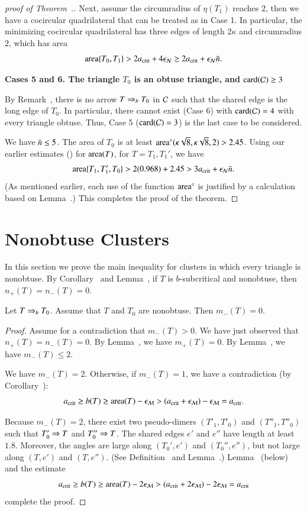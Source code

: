 \begin{proof}[proof of Theorem~.]
Next, assume the circumradius of $\eta(T_1)$ reaches $2$, then we
have a cocircular quadrilateral that can be treated as in Case 1.  In
particular, the minimizing cocircular quadrilateral has three edges of
length $2\kappa$ and circumradius $2$, which has area
\[
{\operatorname{area}}\{T_0,T_1\}
>  2a_\text{crit}+4\epsilon_{\mathcal N} \ge 2a_\text{crit}+\epsilon_{\mathcal N}\bar n.
\]

{\bf Cases 5 and 6. The triangle $T_0$ is an obtuse triangle, and
  ${\operatorname{card}}(\mathcal C)\ge3$} %

By Remark~, there is no arrow $T \Rightarrow_{b} T_0$ in $\mathcal C$
such that the shared edge is the long edge of $T_0$.  In particular,
there cannot exist (Case 6) with ${\operatorname{card}}(\mathcal C)=4$ with %
every triangle obtuse.  Thus, Case 5 (${\operatorname{card}}(\mathcal C)=3$) is the last case to be
considered.

We have $\bar n\le 5$.
The area of $T_0$ is at least
${\operatorname{area}}^\circ(\kappa\sqrt{8},\kappa\sqrt{8},2) > 2.45$.  
Using our earlier estimates ()
for ${\operatorname{area}}(T)$, for $T=T_1,T_1'$, we
have
\[
{\operatorname{area}}\{T_1,T_1',T_0\} > 2 (0.968) + 2.45 > 3a_\text{crit} + \epsilon_{\mathcal N}\bar n.
\] 
(As mentioned earlier, each use of the function ${\operatorname{area}}^\circ$ is justified
by a calculation based on Lemma~.)
This completes the proof of the theorem.
\end{proof}

\section{Nonobtuse Clusters}

In this section we prove the main inequality for clusters in which
every triangle is nonobtuse.  By Corollary~ and
Lemma~, if $T$ is $b$-subcritical and nonobtuse, then
$n_+(T)=n_-(T)=0$.

\begin{lemma} 
  Let $T\Rightarrow_{b} T_0$. Assume that $T$ and $T_0$ are nonobtuse.  Then
  $m_-(T)=0$.
\end{lemma}

\begin{proof}  
  Assume for a contradiction that $m_-(T)>0$.  We have just observed
  that $n_+(T)=n_-(T)=0$.  By Lemma~, we have
  $m_+(T)=0$.  By Lemma~, we have $m_-(T)\le 2$.

  We have $m_-(T)=2$.  Otherwise, if $m_-(T)=1$, we have a
  contradiction (by Corollary~):
\[
a_\text{crit} \ge b(T) \ge {\operatorname{area}}(T) - \epsilon_{\mathcal M} 
> (a_\text{crit} + \epsilon_{\mathcal M}) - \epsilon_{\mathcal M} = a_\text{crit}.
\]

Because $m_-(T)=2$, there exist two pseudo-dimers $(T'_1,T'_0)$ and
$(T''_1,T''_0)$ such that $T'_0\Rightarrow T$ and $T''_0\Rightarrow T$.  The shared
edges $e'$ and $e''$ have length at least $1.8$.  Moreover, the angles
are large along $(T_0',e')$ and $(T_0'',e'')$, but not large along
$(T,e')$ and $(T,e'')$.  (See Definition~ and
Lemma~.)  Lemma~ (below) and the
estimate
\[
a_\text{crit} \ge b(T) \ge {\operatorname{area}}(T) - 2\epsilon_{\mathcal M} 
> (a_\text{crit} + 2\epsilon_{\mathcal M}) - 2\epsilon_{\mathcal M} = a_\text{crit}
\]
complete the proof.
\end{proof}

